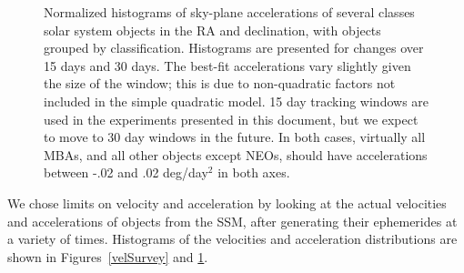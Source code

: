 \begin{figure}[ht!]
  \caption[Acceleration distributions of solar system objects.]{Normalized histograms of sky-plane accelerations of several
    classes solar system objects in the RA and declination, with
    objects grouped by classification.  Histograms are presented for
    changes over 15 days and 30 days. The best-fit accelerations vary
    slightly given the size of the window; this is due to
    non-quadratic factors not included in the simple quadratic model.
    15 day tracking windows are used in the experiments presented in
    this document, but we expect to move to 30 day windows in the
    future.  In both cases, virtually all MBAs, and all other objects
    except NEOs, should have accelerations between -.02 and .02
    deg/day$^2$ in both axes.}
  \label{accSurvey}
\end{figure}

We chose limits on velocity and acceleration by looking at the actual
velocities and accelerations of objects from the SSM, after generating
their ephemerides at a variety of times. Histograms of the velocities
and acceleration distributions are shown in Figures~\ref{velSurvey}
and \ref{accSurvey}. 

